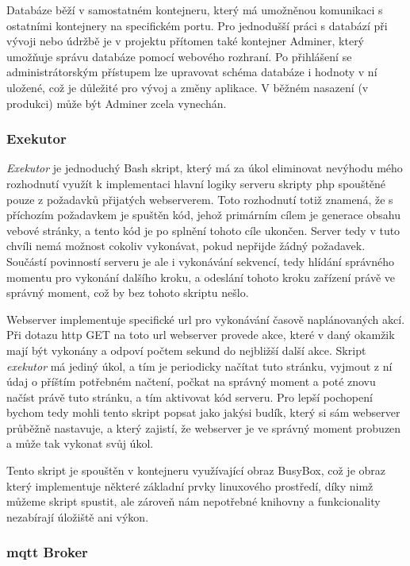 Databáze běží v samostatném kontejneru, který má umožněnou komunikaci s ostatními kontejnery na specifickém portu. Pro jednodušší práci s databází při vývoji nebo údržbě je v projektu přítomen také kontejner Adminer, který umožňuje správu databáze pomocí webového rozhraní. Po přihlášení se administrátorským přístupem lze upravovat schéma databáze i hodnoty v ní uložené, což je důležité pro vývoj a změny
aplikace. V běžném nasazení (v produkci) může být Adminer zcela vynechán.

\subsubsection{Exekutor}

\emph{Exekutor} je jednoduchý Bash skript, který má za úkol eliminovat nevýhodu mého rozhodnutí využít k implementaci hlavní logiky serveru skripty \acrshort{php} spouštěné pouze z požadavků přijatých webserverem. Toto rozhodnutí totiž znamená, že s příchozím požadavkem je spuštěn kód, jehož primárním cílem je generace obsahu vebové stránky, a tento kód je po splnění tohoto cíle ukončen. Server tedy v tuto chvíli nemá možnost cokoliv vykonávat, pokud nepřijde žádný požadavek. Součástí povinností serveru je ale i vykonávání sekvencí, tedy hlídání správného momentu pro vykonání dalšího kroku, a odeslání tohoto kroku zařízení právě ve správný moment, což by bez tohoto skriptu nešlo.

Webserver implementuje specifické \acrshort{url} pro vykonávání časově naplánovaných akcí. Při dotazu \acrshort{http} GET na toto \acrshort{url} webserver provede akce, které v daný okamžik mají být vykonány a odpoví počtem sekund do nejbližší další akce. Skript \emph{exekutor} má jediný úkol, a tím je periodicky načítat tuto stránku, vyjmout z ní údaj o příštím potřebném načtení, počkat na správný moment a poté znovu načíst právě tuto stránku, a tím aktivovat kód serveru. Pro lepší pochopení bychom tedy mohli tento skript popsat jako jakýsi budík, který si sám webserver průběžně nastavuje, a který zajistí, že webserver je ve správný moment probuzen a může tak vykonat svůj úkol.

Tento skript je spouštěn v kontejneru využívající obraz BusyBox, což je obraz který implementuje některé základní prvky linuxového prostředí, díky nimž můžeme skript spustit, ale zároveň nám nepotřebné knihovny a funkcionality nezabírají úložiště ani výkon.

\subsubsection{\acrshort{mqtt} Broker}

